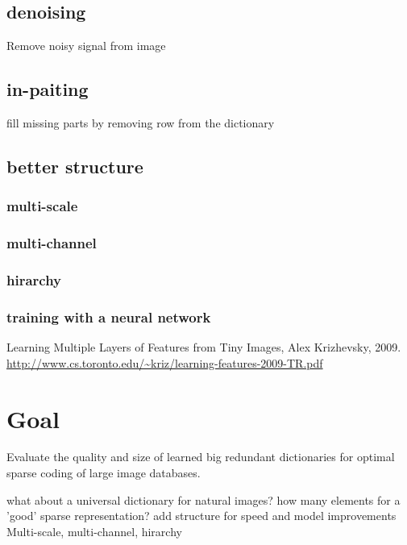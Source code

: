 \subsection{denoising}
Remove noisy signal from image

\subsection{in-paiting}
fill missing parts by removing row from the dictionary

\subsection{better structure}

\subsubsection{multi-scale}
\subsubsection{multi-channel}
\subsubsection{hirarchy}
\subsubsection{training with a neural network}
Learning Multiple Layers of Features from Tiny Images, Alex Krizhevsky, 2009.\\
\url{http://www.cs.toronto.edu/~kriz/learning-features-2009-TR.pdf}

\section{Goal}
Evaluate the quality and size of learned big redundant dictionaries for 
optimal sparse coding of large image databases.

what about a universal dictionary for natural images? 
how many elements for a 'good' sparse representation?
add structure for speed and model improvements
Multi-scale, multi-channel, hirarchy